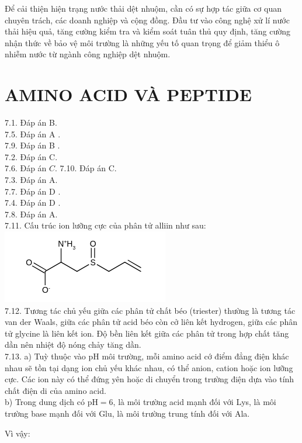 \documentclass[10pt]{article}
\begin{document}
Để cải thiện hiện trạng nước thải dệt nhuộm, cần có sự hợp tác giữa cơ quan chuyên trách, các doanh nghiệp và cộng đồng. Đầu tư vào công nghệ xử lí nước thải hiệu quả, tăng cường kiểm tra và kiểm soát tuân thủ quy định, tăng cường nhận thức về bảo vệ môi trường là những yếu tố quan trọng để giảm thiểu ô nhiễm nước từ ngành công nghiệp dệt nhuộm.

\section*{AMINO ACID VÀ PEPTIDE}
7.1. Đáp án B.\\
7.5. Đáp án A .\\
7.9. Đáp án B .\\
7.2. Đáp án C.\\
7.6. Đáp án $C$. 7.10. Đáp án C.\\
7.3. Đáp án A.\\
7.7. Đáp án D .\\
7.4. Đáp án D .\\
7.8. Đáp án A.\\
7.11. Cấu trúc ion lưỡng cực của phân tử alliin như sau:\\
\includegraphics{smile-808966edbd28a54bf94b551fffb1f2ba3d7d1397}\\
7.12. Tương tác chủ yếu giữa các phân tử chất béo (triester) thường là tương tác van der Waals, giữa các phân tử acid béo còn cở liên kết hydrogen, giữa các phân tử glycine là liên kết ion. Độ bền liên kết giữa các phân tử trong hợp chất tăng dần nên nhiệt độ nóng chảy tăng dần.\\
7.13. a) Tuỳ thuộc vào pH môi trường, mỗi amino acid cớ điểm đẳng điện khác nhau sẽ tồn tại dạng ion chủ yếu khác nhau, có thể anion, cation hoặc ion lưỡng cực. Các ion này có thể đứng yên hoặc di chuyển trong trường điện dựa vào tính chất điện di của amino acid.\\
b) Trong dung dịch có $\mathrm{pH}=6$, là môi trường acid mạnh đối với Lys, là môi trường base mạnh đối với Glu, là môi trường trung tính đối với Ala.

Vì vậy:
\end{document}
